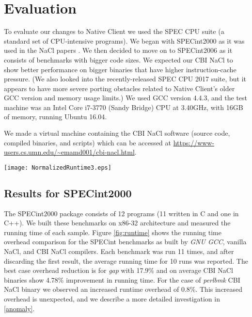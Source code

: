 \documentclass[conference]{IEEEtran}
\begin{document}
\section{Evaluation}
\label{eval}
To evaluate our changes to Native Client we used the SPEC CPU suite (a standard set of CPU-intensive programs). We began with SPECint2000 as it was used in the NaCl papers \cite{yeeNaCl, sehrNaclx64}. We then decided to move on to SPECint2006 as it consists of benchmarks with bigger code sizes. We expected our CBI NaCl to show better performance on bigger binaries that have higher instruction-cache pressure.
(We also looked into the recently-released SPEC CPU 2017 suite, but it appears to have more severe porting obstacles related to Native Client's older GCC version and memory usage limits.)
We used GCC version 4.4.3, and the test machine was an Intel Core i7-3770 (Sandy Bridge) CPU at 3.40GHz, with 16GB of memory, running Ubuntu 16.04. 

We made a virtual machine containing the CBI NaCl software (source code, compiled binaries, and scripts) which can be accessed at 
\url{https://www-users.cs.umn.edu/~emamd001/cbi-nacl.html}.


\begin{figure*}
\centering
\texttt{[image: NormalizedRuntime3.eps]}
\caption{Running time overhead comparison for SPECint2000 (normalized with respect to vanilla NaCl)}
\label{fig:runtime}
\end{figure*}

\subsection{Results for SPECint2000}
\label{sec:result2000}
The SPECint2000 package consists of 12 programs (11 written in C and one in C++). We built these benchmarks on x86-32 architecture and measured the running time of each sample. 
Figure \ref{fig:runtime}  shows the running time overhead comparison for the SPECint benchmarks as built by \textit{GNU GCC}, vanilla NaCl, and CBI NaCl compilers. Each benchmark was run 11 times, and after discarding the first  result, the average running time for 10 runs was reported.
The best case overhead reduction is for \textit{gap} with 17.9\% and on average CBI NaCl binaries show 4.78\% improvement in running time.
For the case of \textit{perlbmk} CBI NaCl binary we observed an increased runtime overhead of 0.8\%. This increased overhead is unexpected, and we describe a more detailed investigation in \ref{anomaly}.
\end{document}
